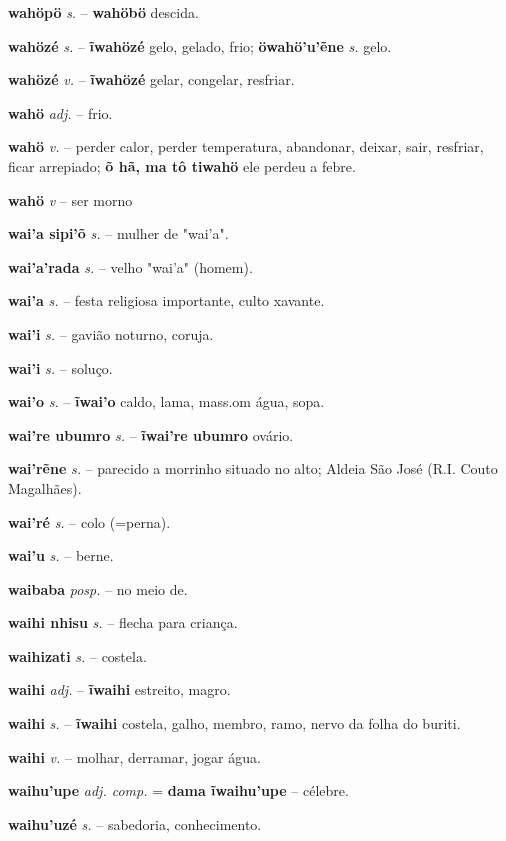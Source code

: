 \textbf{wahöpö} \textit{s.} -- \textbf{wahöbö} descida.

\textbf{wahözé} \textit{s.} -- \textbf{ĩwahözé} gelo, gelado, frio; \textbf{öwahö'u'ẽne} \textit{s.} gelo.

\textbf{wahözé} \textit{v.} -- \textbf{ĩwahözé} gelar, congelar, resfriar.

\textbf{wahö} \textit{adj.} -- frio.

\textbf{wahö} \textit{v.} -- perder calor, perder temperatura, abandonar, deixar, sair, resfriar, ficar arrepiado; \textbf{õ hã, ma tô tiwahö} ele perdeu a febre.

\textbf{wahö} \textit{v} -- {ser morno}

\textbf{wai'a sipi'õ} \textit{s.} -- mulher de "wai'a".

\textbf{wai'a'rada} \textit{s.} -- velho "wai'a" (homem).

\textbf{wai'a} \textit{s.} -- festa religiosa importante, culto xavante.

\textbf{wai'i} \textit{s.} -- gavião noturno, coruja.

\textbf{wai'i} \textit{s.} -- soluço.

\textbf{wai'o} \textit{s.} -- \textbf{ĩwai'o} caldo, lama, mass.om água, sopa.

\textbf{wai're ubumro} \textit{s.} -- \textbf{ĩwai're ubumro} ovário.

\textbf{wai'rẽne} \textit{s.} -- parecido a morrinho situado no alto; Aldeia São José (R.I. Couto Magalhães).

\textbf{wai'ré} \textit{s.} -- colo (=perna).

\textbf{wai'u} \textit{s.} -- berne.

\textbf{waibaba} \textit{posp.} -- no meio de.

\textbf{waihi nhisu} \textit{s.} -- flecha para criança.

\textbf{waihizati} \textit{s.} -- costela.

\textbf{waihi} \textit{adj.} -- \textbf{ĩwaihi} estreito, magro.

\textbf{waihi} \textit{s.} -- \textbf{ĩwaihi} costela, galho, membro, ramo, nervo da folha do buriti.

\textbf{waihi} \textit{v.} -- molhar, derramar, jogar água.

\textbf{waihu'upe} \textit{adj. comp.} = \textbf{dama ĩwaihu'upe} -- célebre.

\textbf{waihu'uzé} \textit{s.} -- sabedoria, conhecimento.

